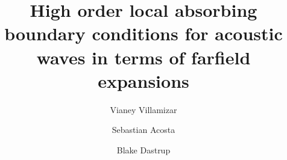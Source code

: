 \documentclass[final,3p,times,12pt]{elsarticle}
\begin{document}
\begin{frontmatter}





\title{\textbf{High order local absorbing boundary conditions for acoustic \\waves in terms of farfield expansions}}

\author[label1]{Vianey Villamizar}

\author[label2]{Sebastian Acosta}

\author[label1]{Blake Dastrup}

\address[label1]{Department of Mathematics, Brigham Young University, Provo, UT}
\address[label2]{Department of Pediatrics - Cardiology, Baylor College of Medicine, Houston, TX}


\end{frontmatter}
\end{document}
